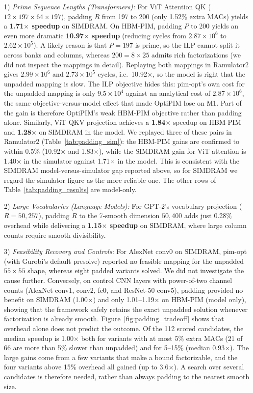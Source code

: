 \documentclass[conference]{IEEEtran}
\begin{document}
1) \emph{Prime Sequence Lengths (Transformers):} For ViT Attention QK ($12 \times 197 \times 64 \times 197$), padding $R$ from 197 to 200 (only 1.52\% extra MACs) yields a \textbf{1.71$\times$ speedup} on SIMDRAM.
On HBM-PIM, padding $P$ to 200 yields an even more dramatic \textbf{10.97$\times$ speedup} (reducing cycles from $2.87 \times 10^6$ to $2.62 \times 10^5$).
A likely reason is that $P=197$ is prime, so the ILP cannot split it across banks and columns, whereas $200 = 8 \times 25$ admits rich factorizations (we did not inspect the mappings in detail). Replaying both mappings in Ramulator2 gives $2.99 \times 10^6$ and $2.73 \times 10^5$ cycles, i.e.\ 10.92$\times$, so the model is right that the unpadded mapping is slow. The ILP objective hides this: pim-opt's own cost for the unpadded mapping is only $9.5 \times 10^4$ against an analytical cost of $2.87 \times 10^6$, the same objective-versus-model effect that made OptiPIM lose on M1. Part of the gain is therefore OptiPIM's weak HBM-PIM objective rather than padding alone.
Similarly, ViT QKV projection achieves a \textbf{1.84$\times$} speedup on HBM-PIM and \textbf{1.28$\times$} on SIMDRAM in the model. We replayed three of these pairs in Ramulator2 (Table~\ref{tab:padding_sim}): the HBM-PIM gains are confirmed to within 0.5\% (10.92$\times$ and 1.83$\times$), while the SIMDRAM gain for ViT attention is 1.40$\times$ in the simulator against 1.71$\times$ in the model. This is consistent with the SIMDRAM model-versus-simulator gap reported above, so for SIMDRAM we regard the simulator figure as the more reliable one. The other rows of Table~\ref{tab:padding_results} are model-only.

2) \emph{Large Vocabularies (Language Models):} For GPT-2's vocabulary projection ($R = 50{,}257$), padding $R$ to the 7-smooth dimension $50{,}400$ adds just 0.28\% overhead while delivering a \textbf{1.15$\times$ speedup} on SIMDRAM, where large column counts require smooth divisibility.

3) \emph{Feasibility Recovery and Controls:} For AlexNet conv0 on SIMDRAM, pim-opt (with Gurobi's default presolve) reported no feasible mapping for the unpadded $55 \times 55$ shape, whereas eight padded variants solved. We did not investigate the cause further.
Conversely, on control CNN layers with power-of-two channel counts (AlexNet conv1, conv2, fc0, and ResNet-50 conv5), padding provided no benefit on SIMDRAM (1.00$\times$) and only 1.01--1.19$\times$ on HBM-PIM (model only), showing that the framework safely retains the exact unpadded solution whenever factorization is already smooth.
Figure~\ref{fig:padding_tradeoff} shows that overhead alone does not predict the outcome. Of the 112 scored candidates, the median speedup is 1.00$\times$ both for variants with at most 5\% extra MACs (21 of 66 are more than 5\% slower than unpadded) and for 5--15\% (median 0.93$\times$). The large gains come from a few variants that make a bound factorizable, and the four variants above 15\% overhead all gained (up to 3.6$\times$). A search over several candidates is therefore needed, rather than always padding to the nearest smooth size.
\end{document}
